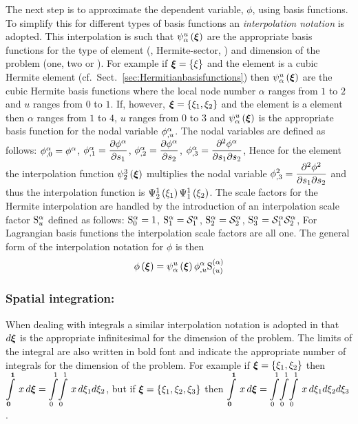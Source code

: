 The next step is to approximate the dependent variable, $\phi$, using basis
functions. To simplify this for different types of basis functions an
\emph{interpolation notation} is adopted. This
interpolation is such that $\gbfn{\alpha}{u}{\vect{\xi}}$ are the appropriate
basis functions for the type of element (\eg \bicubicherm, Hermite-sector,
\etc) and dimension of the problem (one, two or \threedal). For example if
$\vect{\xi}=\bbrac{\xi}$ and the element is a cubic Hermite element 
(cf.~Sect.~\ref{sec:Hermitianbasisfunctions}) then
$\gbfn{\alpha}{u}{\vect{\xi}}$ are the cubic Hermite basis functions where
the local node number $\alpha$ ranges from $1$ to $2$ and $u$ ranges from $0$ to $1$. 
If, however, $\vect{\xi}=\bbrac{\xione,\xitwo}$ and the element is a \bicubicherm element
then $\alpha$ ranges from $1$ to $4$, $u$ ranges from $0$ to $3$ and
$\gbfn{\alpha}{u}{\vect{\xi}}$ is the appropriate basis function for the nodal
variable $  {\phi}^{\alpha} _{,u} $. The nodal variables are defined as
follows: $  {\phi}^{\alpha} _{,0} = {\phi}^{\alpha} $,
$  {\phi}^{\alpha} _{,1} = \dfrac{\partial  {\phi}^{\alpha} }{\partial s_{1}} $,
$  {\phi}^{\alpha} _{,2} = \dfrac{\partial  {\phi}^{\alpha} }{\partial s_{2}} $,
$  {\phi}^{\alpha} _{,3} = \dfrac{\partial^{2}  {\phi}^{\alpha} }{\partial s_{1} \partial s_{2}} $,
\etc Hence for the \bicubicherm element the interpolation function
$\gbfn{2}{3}{\vect{\xi}}$ multiplies the nodal variable
$\phi^{2}_{,3}= \dfrac{\partial^{2} \phi^{2}}{\partial s_{1} \partial s_{2}} $ and thus the
interpolation function is $   \Psi_{2}^{1} \left( \xi_{1} \right)     \Psi_{1}^{1} \left( \xi_{2} \right)  $.  The
scale factors for the Hermite interpolation are handled by the introduction of
an interpolation scale factor $ \mathrm{S}^{\alpha}_{u} $ defined as follows:
$ \mathrm{S}^{\alpha}_{0} =1$, $ \mathrm{S}^{\alpha}_{1} = \mathcal{S}^{\alpha}_{1} $, $ \mathrm{S}^{\alpha}_{2} =
 \mathcal{S}^{\alpha}_{2} $, $ \mathrm{S}^{\alpha}_{3} = \mathcal{S}^{\alpha}_{1}  \mathcal{S}^{\alpha}_{2} $,
\etc For Lagrangian basis functions the interpolation scale factors are all
one. The general form of the interpolation notation for $\phi$ is then
\begin{equation}
  \fnof{\phi}{\vect{\xi}}=\gbfn{\alpha}{u}{\vect{\xi}}\nodedof{\phi}
  {\alpha}{u}\gsf{(\alpha)}{(u)}
  \label{eqn:phiinterpolation}
\end{equation}

\subsubsection{Spatial integration:}
When dealing with integrals a similar interpolation notation is adopted in
that $d\vect{\xi}$ is the appropriate infinitesimal for the dimension of the
problem. The limits of the integral are also written in bold font and indicate
the appropriate number of integrals for the dimension of the problem.  For
example if $\vect{\xi}=\bbrac{\xione,\xitwo}$ then
$\gint{\vect{0}}{\vect{1}}{x}
{\vect{\xi}}=\giint{0}{1}{0}{1}{x}{\xione}{\xitwo}$, but if $\vect{\xi}=
\bbrac{\xione,\xitwo,\xithree}$ then $\gint{\vect{0}}{\vect{1}}{x}
{\vect{\xi}}=\dintl{0}{1}\!\dintl{0}{1}\!\dintl{0}{1}\,x\,d\xione d\xitwo
d\xithree$.

